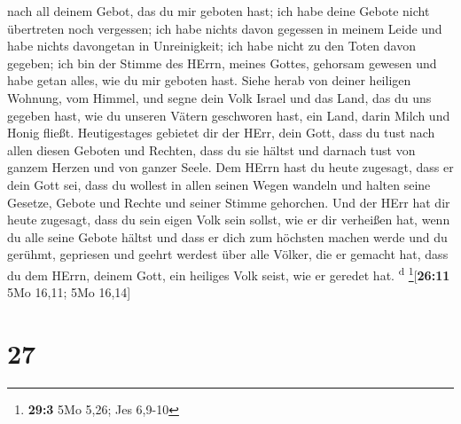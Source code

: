 nach all deinem Gebot, das du mir geboten hast; ich habe deine Gebote
nicht übertreten noch vergessen;  ich habe nichts davon
gegessen in meinem Leide und habe nichts davongetan in Unreinigkeit; ich
habe nicht zu den Toten davon gegeben; ich bin der Stimme des HErrn,
meines Gottes, gehorsam gewesen und habe getan alles, wie du mir geboten
hast.  Siehe herab von deiner heiligen Wohnung, vom
Himmel, und segne dein Volk Israel und das Land, das du uns gegeben
hast, wie du unseren Vätern geschworen hast, ein Land, darin Milch und
Honig fließt.  Heutigestages gebietet dir der HErr, dein
Gott, dass du tust nach allen diesen Geboten und Rechten, dass du sie
hältst und darnach tust von ganzem Herzen und von ganzer Seele.
 Dem HErrn hast du heute zugesagt, dass er dein Gott sei,
dass du wollest in allen seinen Wegen wandeln und halten seine Gesetze,
Gebote und Rechte und seiner Stimme gehorchen.  Und der
HErr hat dir heute zugesagt, dass du sein eigen Volk sein sollst, wie er
dir verheißen hat, wenn du alle seine Gebote hältst  und
dass er dich zum höchsten machen werde und du gerühmt, gepriesen und
geehrt werdest über alle Völker, die er gemacht hat, dass du dem HErrn,
deinem Gott, ein heiliges Volk seist, wie er geredet hat.
\textsuperscript{d} \footnote{\textbf{29:3} 5Mo 5,26; Jes 6,9-10}{[}\textbf{26:11}
5Mo 16,11; 5Mo 16,14{]}

\hypertarget{section-26}{%
\section{27}\label{section-26}}

